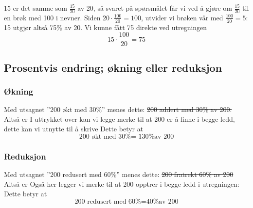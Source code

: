 15 er det samme som $ \frac{15}{20} $ av 20, så svaret på spørsmålet får vi ved å gjøre om $ \frac{15}{20} $ til en brøk med 100 i nevner. Siden $ 20\cdot\frac{100}{20}=100 $, utvider vi brøken vår med $ \frac{100}{20}=5 $:
15 utgjør altså 75\% av 20. Vi kunne fått 75 direkte ved utregningen
\[ 15\cdot \frac{100}{20}=75 \]
\newpage
{}


\subsection{Prosentvis endring; økning eller reduksjon \label{Proendring}}
\subsubsection{Økning} \label{prookning}
Med utsagnet ''200 økt med 30\%'' menes dette:
\st{
200 addert med 30\% av 200.
}
Altså er
I uttrykket over kan vi legge merke  til at 200 er å finne i begge ledd, dette kan vi utnytte til å skrive
Dette betyr at
\[ \text{200 økt med 30\% = 130\% av 200} \] 

\subsubsection{Reduksjon} \label{proredusering}
Med utsagnet ''200 redusert med 60\%'' menes dette:
\st{200 fratrekt 60\% av 200}
Altså er 
Også her legger vi merke til at 200 opptrer i begge ledd i utregningen:
Dette betyr at
\[ \text{200 redusert med 60\%}= \text{40\% av 200} \]

